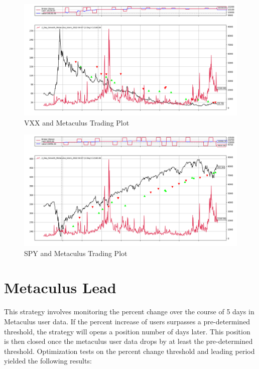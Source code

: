\documentclass{article}
\begin{document}
\begin{figure}[H]
\centering
\includegraphics[width=\textwidth]{Metaculus_MA_VXX.png}
\caption{VXX and Metaculus Trading Plot}
\end{figure}
        
\begin{figure}[H]
\centering
\includegraphics[width=\textwidth]{Metaculus_MA_SPY.png}
\caption{SPY and Metaculus Trading Plot}
\end{figure}
    

\newpage

\section*{Metaculus Lead}
This strategy involves monitoring the percent change over the course of 5 days in Metaculus user data. If the percent increase of users surpasses a pre-determined threshold, the strategy will opens a position number of days later.  This position is then closed once the metaculus user data drops by at least the pre-determined threshold. Optimization tests on the percent change threshold and leading period yielded the following results:
\end{document}
